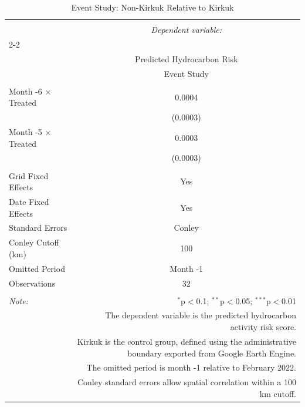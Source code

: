 
\begin{table}[!htbp] \centering 
  \caption{Event Study: Non-Kirkuk Relative to Kirkuk} 
  \label{tab:eventstudy_conley} 
\begin{tabular}{@{\extracolsep{5pt}}lc} 
\\[-1.8ex]\hline 
\hline \\[-1.8ex] 
 & \multicolumn{1}{c}{\textit{Dependent variable:}} \\ 
\cline{2-2} 
\\[-1.8ex] & Predicted Hydrocarbon Risk \\ 
 & Event Study \\ 
\hline \\[-1.8ex] 
 Month -6 × Treated & 0.0004 \\ 
  & (0.0003) \\ 
  Month -5 × Treated & 0.0003 \\ 
  & (0.0003) \\ 
 \hline \\[-1.8ex] 
Grid Fixed Effects & Yes \\ 
Date Fixed Effects & Yes \\ 
Standard Errors & Conley \\ 
Conley Cutoff (km) & 100 \\ 
Omitted Period & Month -1 \\ 
Observations & 32 \\ 
\hline 
\hline \\[-1.8ex] 
\textit{Note:}  & \multicolumn{1}{r}{$^{*}$p$<$0.1; $^{**}$p$<$0.05; $^{***}$p$<$0.01} \\ 
 & \multicolumn{1}{r}{The dependent variable is the predicted hydrocarbon activity risk score.} \\ 
 & \multicolumn{1}{r}{Kirkuk is the control group, defined using the administrative boundary exported from Google Earth Engine.} \\ 
 & \multicolumn{1}{r}{The omitted period is month -1 relative to February 2022.} \\ 
 & \multicolumn{1}{r}{Conley standard errors allow spatial correlation within a 100 km cutoff.} \\ 
\end{tabular} 
\end{table} 
